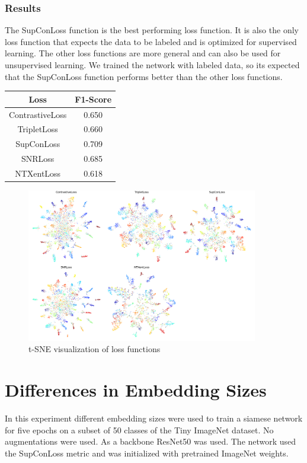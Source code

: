 \documentclass[12pt,a4paper]{report}
\newcommand{\splitlayout}[2]{
	\begin{minipage}{0.6\textwidth}
		#1
	\end{minipage}
	\hfill
	\begin{minipage}{0.35\textwidth}
		#2
	\end{minipage}	
}
\begin{document}
\subsubsection{Results}

\splitlayout{
	The SupConLoss function is the best performing loss function.
	It is also the only loss function that expects the data to be labeled and is optimized for supervised learning.
	The other loss functions are more general and can also be used for unsupervised learning.
	We trained the network with labeled data, so its expected that the SupConLoss function performs better than the other loss functions.
}{
	\begin{tabular}{ | c | c | }
		\hline
		Loss & F1-Score \\ 
		\hline
		ContrastiveLoss & 0.650 \\ 
		\hline
		TripletLoss & 0.660 \\ 
		\hline
		SupConLoss & 0.709 \\ 
		\hline
		SNRLoss & 0.685 \\ 
		\hline
		NTXentLoss & 0.618 \\ 
		\hline
	\end{tabular}
}

\begin{figure}[hb]
	\centering
	\includegraphics[width=0.9\textwidth]{../plots/losses.png}
	\caption{t-SNE visualization of loss functions}
\end{figure}

\newpage

\section{Differences in Embedding Sizes}

In this experiment different embedding sizes were used to train a siamese network for five epochs on a subset of 50 classes of the Tiny ImageNet dataset.
No augmentations were used.
As a backbone ResNet50 was used.
The network used the SupConLoss metric and was initialized with pretrained ImageNet weights.
\end{document}
